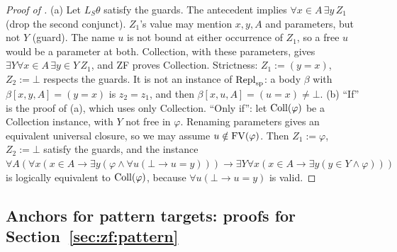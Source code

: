 \begin{proof}[Proof of ]
(a) Let $L_S\theta$ satisfy the guards. The antecedent implies $\forall x{\in}A\,\exists y\,Z_1$ (drop the second
conjunct). $Z_1$'s value may mention $x,y,A$ and parameters, but not $Y$ (guard). The name $u$ is not bound at either
occurrence of $Z_1$, so a free $u$ would be a parameter at both. Collection, with these parameters, gives $\exists Y\forall
x{\in}A\,\exists y{\in}Y\,Z_1$, and ZF proves Collection. Strictness: $Z_1:=(y=x)$, $Z_2:=\bot$ respects the guards. It is
not an instance of $\mathrm{Repl}_{\mathrm{sp}}$: a body $\beta$ with $\beta[x,y,A]=(y=x)$ is $z_2=z_1$, and then $\beta[x,u,A]=(u=x)\ne\bot$.
(b) ``If'' is the proof of (a), which uses only Collection. ``Only if'': let $\mathrm{Coll}(\varphi)$ be a Collection instance,
with $Y$ not free in $\varphi$. Renaming parameters gives an equivalent universal closure, so we may assume
$u\notin\mathrm{FV}(\varphi)$. Then $Z_1:=\varphi$, $Z_2:=\bot$ satisfy the guards, and the instance
$\forall A(\forall x(x\in A\to\exists y(\varphi\wedge\forall u(\bot\to u=y)))\to\exists Y\forall x(x\in A\to\exists
y(y\in Y\wedge\varphi)))$ is logically equivalent to $\mathrm{Coll}(\varphi)$, because $\forall u(\bot\to u=y)$ is valid.
\end{proof}

\subsection{Anchors for pattern targets: proofs for Section~\ref{sec:zf:pattern}}\label{app:zf:anchor}

